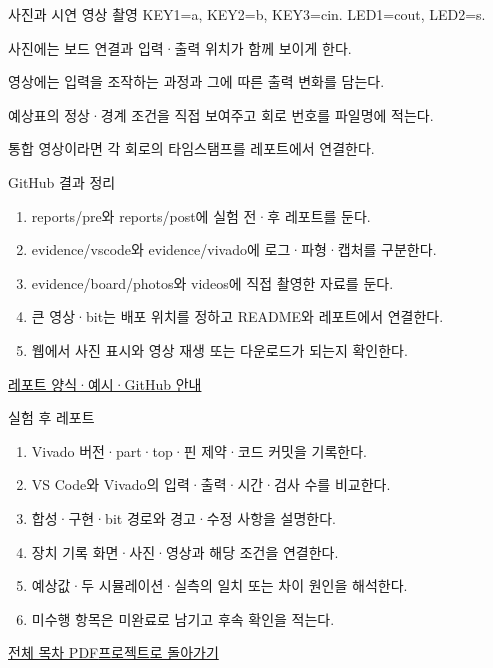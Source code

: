 \begin{frame}{사진과 시연 영상 촬영}\relax
\small
KEY1=a, KEY2=b, KEY3=cin. LED1=cout, LED2=s.\par\vspace{0.22cm}사진에는 보드 연결과 입력·출력 위치가 함께 보이게 한다.\par\vspace{0.22cm}영상에는 입력을 조작하는 과정과 그에 따른 출력 변화를 담는다.\par\vspace{0.22cm}예상표의 정상·경계 조건을 직접 보여주고 회로 번호를 파일명에 적는다.\par\vspace{0.22cm}통합 영상이라면 각 회로의 타임스탬프를 레포트에서 연결한다.\par
\end{frame}

\begin{frame}{GitHub 결과 정리}\relax
\small
\begin{enumerate}\setlength{\itemsep}{0.22cm}
\item reports/pre와 reports/post에 실험 전·후 레포트를 둔다.
\item evidence/vscode와 evidence/vivado에 로그·파형·캡처를 구분한다.
\item evidence/board/photos와 videos에 직접 촬영한 자료를 둔다.
\item 큰 영상·bit는 배포 위치를 정하고 README와 레포트에서 연결한다.
\item 웹에서 사진 표시와 영상 재생 또는 다운로드가 되는지 확인한다.
\end{enumerate}
\href{https://github.com/Glaysia/ece2_26_2_2/blob/daily/0910/example/fpga_projects_hdl/LAB1/docs/reports.md}{레포트 양식·예시·GitHub 안내}
\end{frame}

\begin{frame}{실험 후 레포트}\relax
\small
\begin{enumerate}\setlength{\itemsep}{0.22cm}
\item Vivado 버전·part·top·핀 제약·코드 커밋을 기록한다.
\item VS Code와 Vivado의 입력·출력·시간·검사 수를 비교한다.
\item 합성·구현·bit 경로와 경고·수정 사항을 설명한다.
\item 장치 기록 화면·사진·영상과 해당 조건을 연결한다.
\item 예상값·두 시뮬레이션·실측의 일치 또는 차이 원인을 해석한다.
\item 미수행 항목은 미완료로 남기고 후속 확인을 적는다.
\end{enumerate}
\href{04.LAB1_00_CONTENTS.pdf}{전체 목차 PDF}\quad\href{https://github.com/Glaysia/fpga-lab-example-vivado-2026-1-02-full-adder/tree/8b506af67d1e0cb7bc63854c8bb2a2633d3326be}{프로젝트로 돌아가기}
\end{frame}
\endgroup

